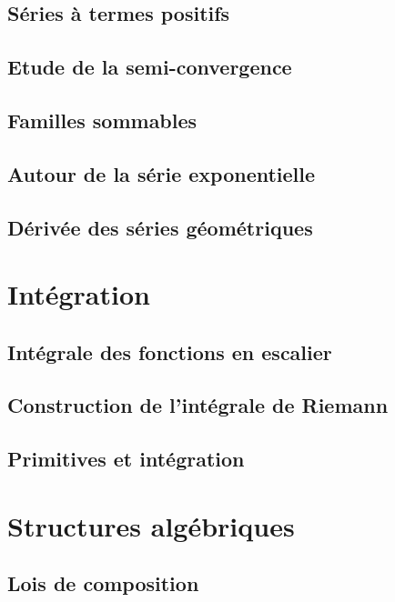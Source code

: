\documentclass[11pt,twoside,a4paper]{article}
\begin{document}
\subsection{Séries à termes positifs}

\subsection{Etude de la semi-convergence}

\subsection{Familles sommables}

\subsection{Autour de la série exponentielle}

\subsection{Dérivée des séries géométriques}

\newpage
\section{Intégration}

\subsection{Intégrale des fonctions en escalier}

\subsection{Construction de l'intégrale de Riemann}

\subsection{Primitives et intégration}


\newpage
\section{Structures algébriques}

\subsection{Lois de composition}
\end{document}
